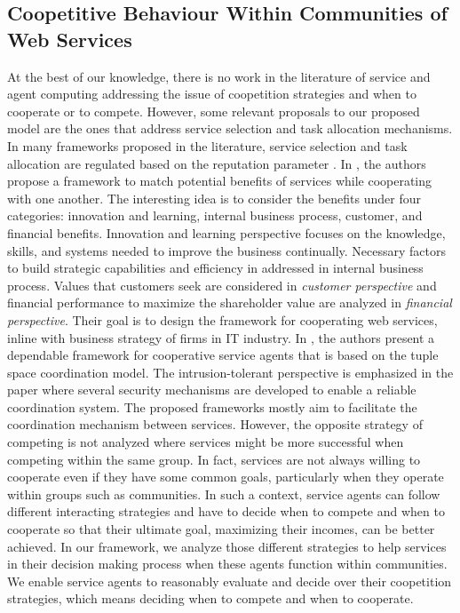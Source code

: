 \subsection{Coopetitive Behaviour Within Communities of Web Services}\label{sec:coopetetive}

At the best of our knowledge, there is no work in the literature of service and agent computing addressing the issue of coopetition strategies and when to cooperate or to compete. However, some relevant proposals to our proposed model are the ones that address service selection and task allocation mechanisms. In many frameworks proposed in the literature, service selection and task allocation are regulated based on the reputation parameter \cite{Bentahar:2012:ARA:2343124.2343267,DBLP:journals/jwsr/RosarioBJ10,Ruth_Tu_2007-7,journals/kbs/Yahyaoui12}. In \cite{HuangCommunications}, the authors propose a framework to match potential benefits of services while cooperating with one another. The interesting idea is to consider the benefits under four categories: innovation and learning, internal business process, customer, and financial benefits. Innovation and learning perspective focuses on the knowledge, skills, and systems needed to improve the business continually. Necessary factors to build strategic capabilities and efficiency in addressed in internal business process. Values that customers seek are considered in \emph{customer perspective} and financial performance to maximize the shareholder value are analyzed in \emph{financial perspective}. Their goal is to design the framework for cooperating web services, inline with business strategy of firms in IT industry. In \cite{alchieri:a}, the authors present a dependable framework for cooperative service agents that is based on the tuple space coordination model. The intrusion-tolerant perspective is emphasized in the paper where several security mechanisms are developed to enable a reliable coordination system. %
The proposed frameworks mostly aim to facilitate the coordination mechanism between services. However, the opposite strategy of competing is not analyzed where services might be more successful when competing within the same group. In fact, services are not always willing to cooperate even if they have some common goals, particularly when they operate within groups such as communities. In such a context, service agents can follow different interacting strategies and have to decide when to compete and when to cooperate so that their ultimate goal, maximizing their incomes, can be better achieved. In our framework, we analyze those different strategies to help services in their decision making process when these
agents function within communities.
We enable service agents to reasonably evaluate and decide over their coopetition strategies, which means deciding when to compete and when to cooperate.



